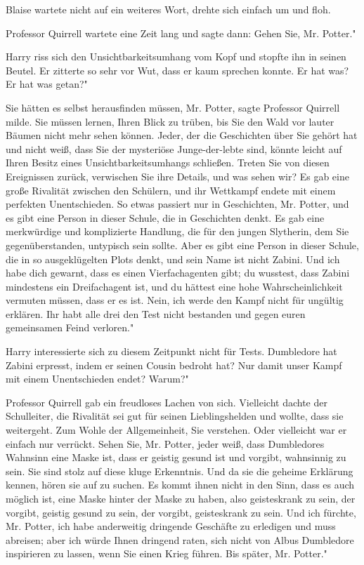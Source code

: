 Blaise wartete nicht auf ein weiteres Wort, drehte sich einfach um und floh.

Professor Quirrell wartete eine Zeit lang und sagte dann: \glqq Gehen Sie, Mr.
Potter."

Harry riss sich den Unsichtbarkeitsumhang vom Kopf und stopfte ihn in seinen
Beutel. Er zitterte so sehr vor Wut, dass er kaum sprechen konnte. \glqq Er hat
was? Er hat was getan?"

\glqq Sie hätten es selbst herausfinden müssen, Mr. Potter\grqq{}, sagte
Professor Quirrell milde. \glqq Sie müssen lernen, Ihren Blick zu trüben, bis
Sie den Wald vor lauter Bäumen nicht mehr sehen können. Jeder, der die
Geschichten über Sie gehört hat und nicht weiß, dass Sie der mysteriöse
Junge-der-lebte sind, könnte leicht auf Ihren Besitz eines
Unsichtbarkeitsumhangs schließen. Treten Sie von diesen Ereignissen zurück,
verwischen Sie ihre Details, und was sehen wir? Es gab eine große Rivalität
zwischen den Schülern, und ihr Wettkampf endete mit einem perfekten
Unentschieden. So etwas passiert nur in Geschichten, Mr. Potter, und es gibt
eine Person in dieser Schule, die in Geschichten denkt. Es gab eine merkwürdige
und komplizierte Handlung, die für den jungen Slytherin, dem Sie
gegenüberstanden, untypisch sein sollte. Aber es gibt eine Person in dieser
Schule, die in so ausgeklügelten Plots denkt, und sein Name ist nicht Zabini.
Und ich habe dich gewarnt, dass es einen Vierfachagenten gibt; du wusstest, dass
Zabini mindestens ein Dreifachagent ist, und du hättest eine hohe
Wahrscheinlichkeit vermuten müssen, dass er es ist. Nein, ich werde den Kampf
nicht für ungültig erklären. Ihr habt alle drei den Test nicht bestanden und
gegen euren gemeinsamen Feind verloren."

Harry interessierte sich zu diesem Zeitpunkt nicht für Tests. \glqq Dumbledore
hat Zabini erpresst, indem er seinen Cousin bedroht hat? Nur damit unser Kampf
mit einem Unentschieden endet? Warum?"

Professor Quirrell gab ein freudloses Lachen von sich. \glqq Vielleicht dachte
der Schulleiter, die Rivalität sei gut für seinen Lieblingshelden und wollte,
dass sie weitergeht. Zum Wohle der Allgemeinheit, Sie verstehen. Oder vielleicht
war er einfach nur verrückt. Sehen Sie, Mr. Potter, jeder weiß, dass Dumbledores
Wahnsinn eine Maske ist, dass er geistig gesund ist und vorgibt, wahnsinnig zu
sein. Sie sind stolz auf diese kluge Erkenntnis. Und da sie die geheime
Erklärung kennen, hören sie auf zu suchen. Es kommt ihnen nicht in den Sinn,
dass es auch möglich ist, eine Maske hinter der Maske zu haben, also
geisteskrank zu sein, der vorgibt, geistig gesund zu sein, der vorgibt,
geisteskrank zu sein. Und ich fürchte, Mr. Potter, ich habe anderweitig
dringende Geschäfte zu erledigen und muss abreisen; aber ich würde Ihnen
dringend raten, sich nicht von Albus Dumbledore inspirieren zu lassen, wenn Sie
einen Krieg führen. Bis später, Mr. Potter."

